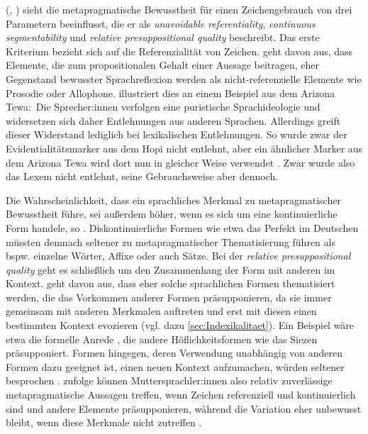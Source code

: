 \citeauthor{Silverstein.1981} (\citeyear[4]{Silverstein.1981}, \citeyear[s. auch][41]{Silverstein.1976}) sieht die metapragmatische Bewusstheit für einen Zeichengebrauch von drei Parametern beeinflusst, die er als \textit{unavoidable referentiality}, \textit{continuous segmentability} und \textit{relative presuppositional quality} beschreibt.
Das erste Kriterium bezieht sich auf die Referenzialität von Zeichen.
\citet[5]{Silverstein.1981} geht davon aus, dass Elemente, die zum propositionalen Gehalt einer Aussage beitragen, eher Gegenstand bewusster Sprachreflexion werden als nicht-referenzielle Elemente wie Prosodie oder Allophone.
\citet[506--507]{Kroskrity.2004} illustriert dies an einem Beispiel aus dem Arizona Tewa:~Die Sprecher:innen verfolgen eine puristische Sprachideologie und widersetzen sich daher Entlehnungen aus anderen Sprachen. 
Allerdings greift dieser Widerstand lediglich bei lexikalischen Entlehnungen. 
So wurde zwar der Evidentialitätsmarker  aus dem Hopi nicht entlehnt, aber ein ähnlicher Marker aus dem Arizona Tewa wird dort nun in gleicher Weise verwendet \citep[s.][507]{Kroskrity.2004}.
Zwar wurde also das Lexem nicht entlehnt, seine Gebrauchsweise aber dennoch.

Die Wahrscheinlichkeit, dass ein sprachliches Merkmal zu metapragmatischer Bewusstheit führe, sei außerdem höher, wenn es sich um eine kontinuierliche Form handele, so \citet[6]{Silverstein.1981}. 
Diskontinuierliche Formen wie etwa das Perfekt im Deutschen müssten demnach seltener zu metapragmatischer Thematisierung führen als bspw. einzelne Wörter, Affixe oder auch Sätze. 
Bei der \textit{relative presuppositional quality} geht es schließlich um den Zusammenhang der Form mit anderen im Kontext. 
\citet[6--7]{Silverstein.1981} geht davon aus, dass eher solche sprachlichen Formen thematisiert werden, die das Vorkommen anderer Formen präsupponieren, da sie immer gemeinsam mit anderen Merkmalen auftreten und erst mit diesen einen bestimmten Kontext evozieren (vgl. dazu \autoref{sec:Indexikalitaet}). 
Ein Beispiel wäre etwa die formelle Anrede , die andere Höflichkeitsformen wie das Siezen präsupponiert.  
Formen hingegen, deren Verwendung unabhängig von anderen Formen dazu geeignet ist, einen neuen Kontext aufzumachen, würden seltener besprochen \citep[7]{Silverstein.1981}. 
\citet[5--8]{Silverstein.1981} zufolge k{\"o}nnen Muttersprachler:innen  also relativ zuverl{\"a}ssige metapragmatische Aussagen treffen, wenn Zeichen referenziell und kontinuierlich sind und andere Elemente präsupponieren, w{\"a}hrend die Variation eher unbewusst bleibt, wenn diese Merkmale nicht zutreffen \citep[vgl. auch][49]{Silverstein.1976}. 


